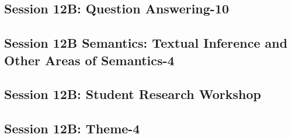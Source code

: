 \subsection{\large Session 12B: Question Answering-10}
\label{parallel-session-12B-trackG}
\TrackGLoc\hfill\sessionchair{}{}
\clearpage
\subsection{\large Session 12B Semantics: Textual Inference and Other Areas of Semantics-4}
\label{parallel-session-12B-trackH}
\TrackHLoc\hfill\sessionchair{}{}
\clearpage
\subsection{\large Session 12B: Student Research Workshop}
\label{parallel-session-12B-trackI}
\TrackILoc\hfill\sessionchair{}{}
\clearpage
\subsection{\large Session 12B: Theme-4}
\label{parallel-session-12B-trackJ}
\TrackJLoc\hfill\sessionchair{}{}
\clearpage


